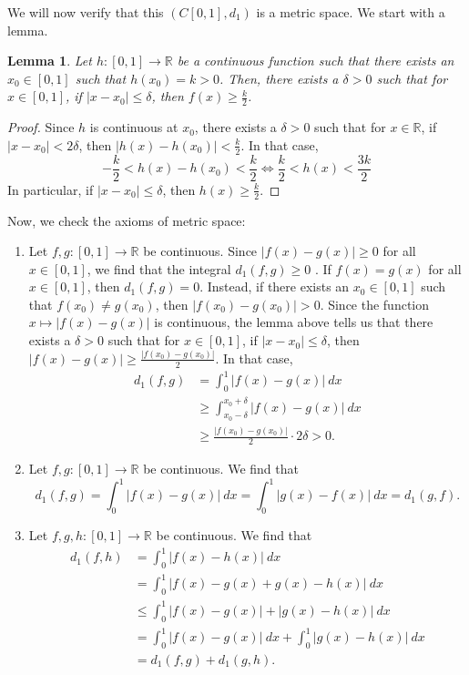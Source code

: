 \documentclass[a4paper, openany]{memoir}
\theoremstyle{definition}
\theoremstyle{plain}
\newtheorem{lemma}[definition]{Lemma}
\begin{document}
We will now verify that this $(C[0, 1], d_1)$ is a metric space. We start with a lemma.
\begin{lemma}
Let $h: [0, 1] \to \mathbb{R}$ be a continuous function such that there exists an $x_0 \in [0, 1]$ such that $h(x_0) = k > 0$. Then, there exists a $\delta > 0$ such that for $x \in [0, 1]$, if $|x - x_0| \leqslant \delta$, then $f(x) \geqslant \frac{k}{2}$.
\end{lemma}
\begin{proof}
Since $h$ is continuous at $x_0$, there exists a $\delta > 0$ such that for $x \in \mathbb{R}$, if $|x - x_0| < 2\delta$, then $|h(x) - h(x_0)| < \frac{k}{2}$. In that case,
\[-\frac{k}{2} < h(x) - h(x_0) < \frac{k}{2} \iff \frac{k}{2} < h(x) < \frac{3k}{2}\]
In particular, if $|x - x_0| \leqslant \delta$, then $h(x) \geqslant \frac{k}{2}$.
\end{proof}
\noindent Now, we check the axioms of metric space:
\begin{enumerate}[label=\textbf{M\arabic*}.]
    \item Let $f, g: [0, 1] \to \mathbb{R}$ be continuous. Since $|f(x) - g(x)| \geqslant 0$ for all $x \in [0, 1]$, we find that the integral $d_1(f, g) \geqslant 0$ . If $f(x) = g(x)$ for all $x \in [0, 1]$, then $d_1(f, g) = 0$. Instead, if there exists an $x_0 \in [0, 1]$ such that $f(x_0) \neq g(x_0)$, then $|f(x_0) - g(x_0)| > 0$. Since the function $x \mapsto |f(x) - g(x)|$ is continuous, the lemma above tells us that there exists a $\delta > 0$ such that for $x \in [0, 1]$, if $|x - x_0| \leqslant \delta$, then $|f(x) - g(x)| \geqslant \frac{|f(x_0) - g(x_0)|}{2}$. In that case,
    \begin{align*}
        d_1(f, g) &= \int_{0}^1 |f(x) - g(x)| \ dx \\
        &\geqslant \int_{x_0 - \delta}^{x_0 + \delta} |f(x) - g(x)| \ dx \\
        &\geqslant \frac{|f(x_0) - g(x_0)|}{2} \cdot 2\delta > 0.
    \end{align*}
    
    \item Let $f, g: [0, 1] \to \mathbb{R}$ be continuous. We find that
    \[d_1(f, g) = \int_0^1 |f(x) - g(x)| \ dx = \int_0^1 |g(x) - f(x)| \ dx = d_1(g, f).\]
    
    \item Let $f, g, h: [0, 1] \to \mathbb{R}$ be continuous. We find that
    \begin{align*}
        d_1(f, h) &= \int_0^1 |f(x) - h(x)| \ dx \\
        &= \int_0^1 |f(x) - g(x) + g(x) - h(x)| \ dx \\
        &\leqslant \int_0^1 |f(x) - g(x)| + |g(x) - h(x)| \ dx \\
        &= \int_0^1 |f(x) - g(x)| \ dx + \int_0^1 |g(x) - h(x)| \ dx \\
        &= d_1(f, g) + d_1(g, h).
    \end{align*}
\end{enumerate}
\end{document}
